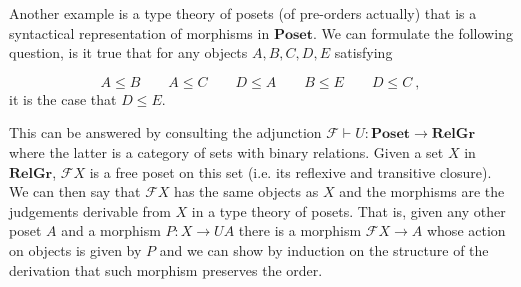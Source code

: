 \documentclass[acmsmall,screen, nonacm, anonymous]{acmart}
\begin{document}
\begin{example}

Another example is a type theory of posets (of pre-orders actually) that is a syntactical representation of morphisms in $\mathbf{Poset}$.
We can formulate the following question, is it true that for any objects $A,B,C,D,E$ satisfying

\[
A \leq B \qquad A \leq C \qquad D \leq A \qquad B \leq E \qquad D \leq C~,
\]
it is the case that $D \leq E$.

This can be answered by consulting the adjunction $\mathcal{F} \vdash U : \mathbf{Poset} \to \mathbf{RelGr}$ where the latter is a category of sets with binary relations.
Given a set $X$ in $\mathbf{RelGr}$, $\mathcal{F}X$ is a free poset on this set (i.e. its reflexive and transitive closure).
We can then say that $\mathcal{F}X$ has the same objects as $X$ and the morphisms are the judgements derivable from $X$ in a type theory of posets.
That is, given any other poset $A$ and a morphism $P : X \to UA$ there is a morphism $\mathcal{F}X \to A$ whose action on objects is given by $P$ and we can show by induction on the structure of the derivation that such morphism preserves the order.
\end{example}
\end{document}
